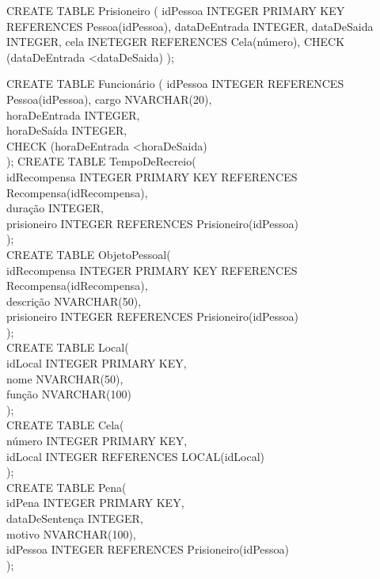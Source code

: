 \documentclass{article}
\begin{document}
\noindent
CREATE TABLE Prisioneiro (\newline
idPessoa	INTEGER PRIMARY KEY REFERENCES Pessoa(idPessoa),\newline
dataDeEntrada	INTEGER,\newline
dataDeSaida	INTEGER,\newline
cela		INETEGER REFERENCES Cela(número),\newline
CHECK	(dataDeEntrada \textless  dataDeSaida)\newline
);\newline

CREATE TABLE Funcionário (\newline
idPessoa	INTEGER REFERENCES Pessoa(idPessoa),\newline
cargo		NVARCHAR(20),\\
horaDeEntrada	INTEGER,\\
horaDeSaída	INTEGER,\\
CHECK (horaDeEntrada \textless horaDeSaida)\\
);
\newpage
CREATE TABLE TempoDeRecreio(\\
idRecompensa	INTEGER PRIMARY KEY REFERENCES Recompensa(idRecompensa),\\
duração		INTEGER,\\
prisioneiro	INTEGER REFERENCES Prisioneiro(idPessoa)\\
);\\

CREATE TABLE ObjetoPessoal(\\
idRecompensa	INTEGER PRIMARY KEY REFERENCES Recompensa(idRecompensa),\\
descrição	NVARCHAR(50),\\
prisioneiro 	INTEGER REFERENCES Prisioneiro(idPessoa)\\
);\\

CREATE TABLE Local(\\
idLocal		INTEGER PRIMARY KEY,\\
nome		NVARCHAR(50),\\
função		NVARCHAR(100)\\
);\\

CREATE TABLE Cela(\\
número		INTEGER PRIMARY KEY,\\
idLocal		INTEGER REFERENCES LOCAL(idLocal)\\
);\\

CREATE TABLE Pena(\\
idPena 		INTEGER PRIMARY KEY,\\
dataDeSentença	INTEGER,\\
motivo		NVARCHAR(100),\\
idPessoa	INTEGER REFERENCES Prisioneiro(idPessoa)\\
);
\end{document}
